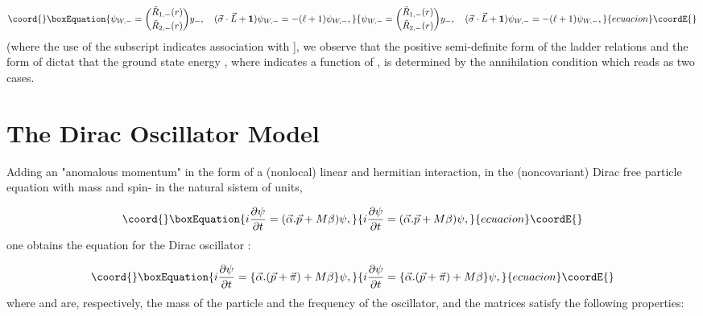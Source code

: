 \documentclass[a4paper,dvips,12pt]{article}
\begin{document}
\begin{equation}\coord{}\boxEquation{
\label{2-17}
\psi_{W,-} = {\tilde R_{1,-}(r)\choose\tilde R_{2,-}(r)} y_-, \quad
(\vec \sigma \cdot \vec L + {\bf 1})\psi_{W,-} = -(\ell+1)\psi_{W,-},
}{
\psi_{W,-} = {\tilde R_{1,-}(r)\choose\tilde R_{2,-}(r)} y_-, \quad
(\vec \sigma \cdot \vec L + {\bf 1})\psi_{W,-} = -(\ell+1)\psi_{W,-},
}{ecuacion}\coordE{}\end{equation}
(where the use of the subscript \myHighlight{$+(-)$}\coordHE{} indicates association with
\myHighlight{$[y_+(y_-)$}\coordHE{}], we observe that the positive semi-definite form of \coordHE{} the
ladder relations and the form of \coordHE{} dictat that
the ground state energy \coordHE{}, where \coordHE{} indicates a
function of \coordHE{}, is determined by the
annihilation condition which reads as
two cases.

\section{The Dirac Oscillator Model}

Adding an "anomalous momentum" in the form of a (nonlocal)
linear and hermitian  interaction,
\coordHE{}
in the (noncovariant) Dirac free particle equation with
mass \coordHE{} and spin-\coordHE{} in the natural sistem of units,

\begin{equation}\coord{}\boxEquation{
\label{ED}
i{\partial \psi \over \partial t} = (\vec{\alpha }.\vec{p} +
M\beta )\psi,
}{
i{\partial \psi \over \partial t} = (\vec{\alpha }.\vec{p} +
M\beta )\psi,
}{ecuacion}\coordE{}\end{equation}
one obtains the equation for the Dirac oscillator  \cite{Mosh89}:

\begin{equation}\coord{}\boxEquation{
\label{OD}
 i{\partial \psi \over \partial t} = \{\vec{\alpha }.(\vec{p} +
\vec{\pi }) + M\beta \}\psi ,
}{
i{\partial \psi \over \partial t} = \{\vec{\alpha }.(\vec{p} +
\vec{\pi }) + M\beta \}\psi ,
}{ecuacion}\coordE{}\end{equation}
where \coordHE{} and \myHighlight{$\omega$}\coordHE{}  are, respectively, the  mass of the  particle and the
frequency of the oscillator, and the  matrices \myHighlight{$(\vec{\alpha }, \beta )$}\coordHE{}
satisfy the following properties:
\end{document}
